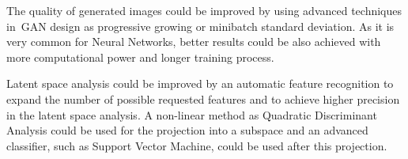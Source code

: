 The quality of generated images could be improved by using advanced techniques in~GAN design as progressive growing or minibatch standard deviation. As it is very common for Neural Networks, better results could be also achieved with more computational power and longer training process.

Latent space analysis could be improved by an automatic feature recognition to expand the number of possible requested features and to achieve higher precision in the latent space analysis. A non-linear method as Quadratic Discriminant Analysis could be used for the projection into a subspace and an advanced classifier, such as Support Vector Machine, could be used after this projection.
